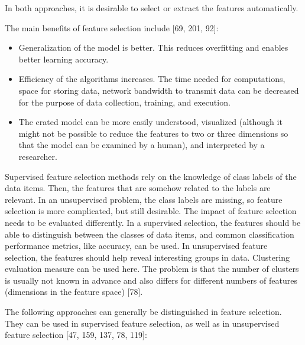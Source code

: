 \documentclass[11pt,openany,executivepaper]{book}
\begin{document}
In both approaches, it is desirable to select or extract the features automatically.

The main benefits of feature selection include [69, 201, 92]:

\begin{itemize}
  \item Generalization of the model is better. This reduces overfitting and enables better learning accuracy.
  \item Efficiency of the algorithms increases. The time needed for computations, space for storing data, network bandwidth to transmit data can be decreased for the purpose of data collection, training, and execution.
  \item The crated model can be more easily understood, visualized (although it might not be possible to reduce the features to two or three dimensions so that the model can be examined by a human), and interpreted by a researcher.
\end{itemize}

Supervised feature selection methods rely on the knowledge of class labels of the data items. Then, the features that are somehow related to the labels are relevant. In an unsupervised problem, the class labels are missing, so feature selection is more complicated, but still desirable. The impact of feature selection needs to be evaluated differently. In a supervised selection, the features should be able to distinguish between the classes of data items, and common classification performance metrics, like accuracy, can be used. In unsupervised feature selection, the features should help reveal interesting groups in data. Clustering evaluation measure can be used here. The problem is that the number of clusters is usually not known in advance and also differs for different numbers of features (dimensions in the feature space) [78].

The following approaches can generally be distinguished in feature selection. They can be used in supervised feature selection, as well as in unsupervised feature selection [47, 159, 137, 78, 119]:
\end{document}
